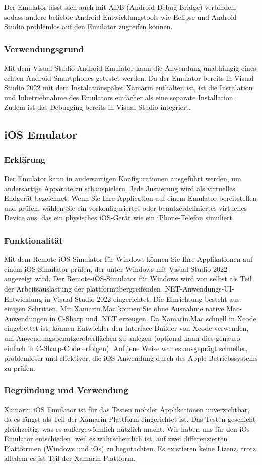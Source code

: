 Der Emulator lässt sich auch mit ADB (Android Debug Bridge) verbinden, 
sodass andere beliebte Android Entwicklungstools wie Eclipse und Android Studio problemlos auf den Emulator zugreifen können.

\subsubsection{Verwendungsgrund}
Mit dem Visual Studio Android Emulator kann die Anwendung unabhängig eines echten Android-Smartphones getestet werden. 
Da der Emulator bereits in Visual Studio 2022 mit dem Instalationspaket Xamarin enthalten ist, ist die Instalation und Inbetriebnahme des 
Emulators einfacher als eine separate Installation. Zudem ist das Debugging bereits in Visual Studio integriert.


\subsection{iOS Emulator}
\cite{IOsEmulatorOnMac}
\cite{IOsEmulatorOnWin}
\subsubsection*{Erklärung}
Der Emulator kann in andersartigen Konfigurationen 
ausgeführt werden, um andersartige Apparate zu schauspielern. 
Jede Justierung wird als virtuelles Endgerät bezeichnet. 
Wenn Sie Ihre Application auf einem Emulator bereitstellen 
und prüfen, wählen Sie ein vorkonfiguriertes oder 
benutzerdefiniertes virtuelles Device aus, das ein 
physisches iOS-Gerät wie ein iPhone-Telefon simuliert.
\subsubsection*{Funktionalität}
Mit dem Remote-iOS-Simulator für Windows können Sie Ihre 
Applikationen auf einem iOS-Simulator prüfen, der unter Windows mit 
Visual Studio 2022 angezeigt wird.
Der Remote-iOS-Simulator für Windows wird von selbst als Teil der 
Arbeitsauslastung der plattformübergreifenden .NET-Anwendungs-UI-Entwicklung 
in Visual Studio 2022 eingerichtet. Die Einrichtung besteht aus einigen Schritten.
Mit Xamarin.Mac können Sie ohne Ausnahme native Mac-Anwendungen in C-Sharp und .NET 
erzeugen. Da Xamarin.Mac schnell in Xcode eingebettet ist, können 
Entwickler den Interface Builder von Xcode verwenden, um Anwendungsbenutzeroberflächen 
zu anlegen (optional kann dies genauso einfach in C-Sharp-Code erfolgen). 
Auf jene Weise war es ausgeprägt schneller, problemloser und effektiver, 
die iOS-Anwendung durch des Apple-Betriebssystems zu prüfen.
\subsubsection*{Begründung und Verwendung}
Xamarin iOS Emulator ist für das Testen mobiler Applikationen unverzichtbar, 
da es längst als Teil der Xamarin-Plattform eingerichtet ist. Das Testen 
geschieht gleichzeitig, was es außergewöhnlich nützlich macht. 
Wir haben uns für den iOs-Emulator entschieden, weil es wahrscheinlich 
ist, auf zwei differenzierten Plattformen (Windows und iOs) zu 
begutachten. Es existieren keine Lizenz, trotz alledem es ist Teil der Xamarin-Plattform.
\newpage